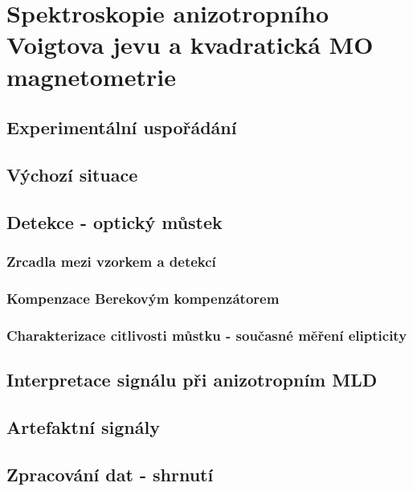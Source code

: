 \chapter{Spektroskopie anizotropního Voigtova jevu a kvadratická MO magnetometrie}\label{k:popis metody}


\section{Experimentální uspořádání}


\section{Výchozí situace}

\section{Detekce - optický můstek}

\subsection{Zrcadla mezi vzorkem a detekcí}

\subsection{Kompenzace Berekovým kompenzátorem}

\subsection{Charakterizace citlivosti můstku - současné měření elipticity}

\section{Interpretace signálu při anizotropním MLD}

\section{Artefaktní signály}

\section{Zpracování dat - shrnutí}
